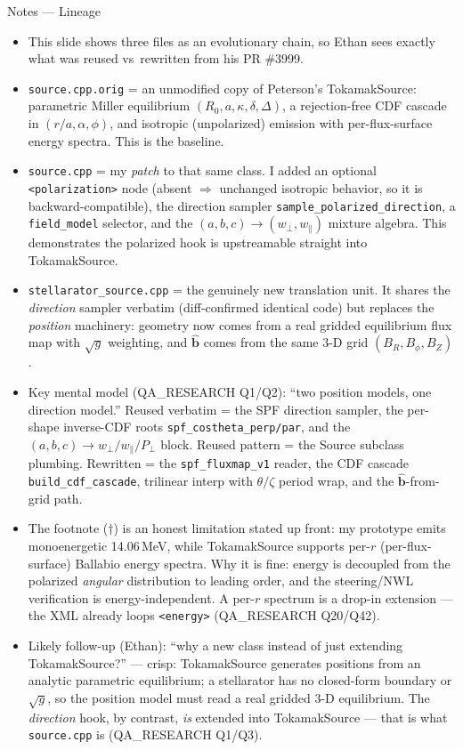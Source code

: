 \documentclass[11pt,aspectratio=169]{beamer}
\newcommand{\bhat}{\hat{\mathbf{b}}}
\begin{document}
\begin{frame}[allowframebreaks]{Notes --- Lineage}
{\color{red}\footnotesize
\begin{itemize}
\item This slide shows three files as an evolutionary chain, so Ethan sees exactly what was
      reused vs\ rewritten from his PR \#3999.
\item \texttt{source.cpp.orig} = an unmodified copy of Peterson's TokamakSource: parametric
      Miller equilibrium $(R_0,a,\kappa,\delta,\Delta)$, a rejection-free CDF cascade in
      $(r/a,\alpha,\phi)$, and isotropic (unpolarized) emission with per-flux-surface energy
      spectra. This is the baseline.
\item \texttt{source.cpp} = my \emph{patch} to that same class. I added an optional
      \texttt{<polarization>} node (absent $\Rightarrow$ unchanged isotropic behavior, so it is
      backward-compatible), the direction sampler \texttt{sample\_polarized\_direction}, a
      \texttt{field\_model} selector, and the $(a,b,c)\!\to\!(w_\perp,w_\parallel)$ mixture
      algebra. This demonstrates the polarized hook is upstreamable straight into TokamakSource.
\item \texttt{stellarator\_source.cpp} = the genuinely new translation unit. It shares the
      \emph{direction} sampler verbatim (diff-confirmed identical code) but replaces the
      \emph{position} machinery: geometry now comes from a real gridded equilibrium flux map
      with $\sqrt{g}$ weighting, and $\bhat$ comes from the same 3-D grid $(B_R,B_\phi,B_Z)$.
\item Key mental model (QA\_RESEARCH Q1/Q2): ``two position models, one direction model.''
      Reused verbatim = the SPF direction sampler, the per-shape inverse-CDF roots
      \texttt{spf\_costheta\_perp/par}, and the $(a,b,c)\!\to\!w_\perp/w_\parallel/P_\perp$
      block. Reused pattern = the Source subclass plumbing. Rewritten = the
      \texttt{spf\_fluxmap\_v1} reader, the CDF cascade \texttt{build\_cdf\_cascade}, trilinear
      interp with $\theta/\zeta$ period wrap, and the $\bhat$-from-grid path.
\item The footnote ($\dagger$) is an honest limitation stated up front: my prototype emits
      monoenergetic 14.06\,MeV, while TokamakSource supports per-$r$ (per-flux-surface) Ballabio
      energy spectra. Why it is fine: energy is decoupled from the polarized \emph{angular}
      distribution to leading order, and the steering/NWL verification is energy-independent. A
      per-$r$ spectrum is a drop-in extension --- the XML already loops \texttt{<energy>}
      (QA\_RESEARCH Q20/Q42).
\item Likely follow-up (Ethan): ``why a new class instead of just extending TokamakSource?'' ---
      crisp: TokamakSource generates positions from an analytic parametric equilibrium; a
      stellarator has no closed-form boundary or $\sqrt{g}$, so the position model must read a
      real gridded 3-D equilibrium. The \emph{direction} hook, by contrast, \emph{is} extended
      into TokamakSource --- that is what \texttt{source.cpp} is (QA\_RESEARCH Q1/Q3).
\end{itemize}
}
\end{frame}
\end{document}
